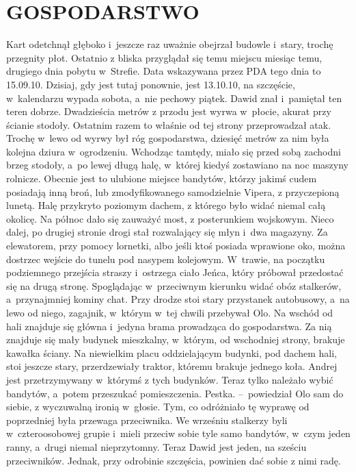 \documentclass[../MAIN.tex]{subfiles}
\begin{document}
\section*{GOSPODARSTWO}
\mm Kart odetchnął głęboko i~jeszcze raz uważnie obejrzał budowle i~stary, trochę przegnity płot. Ostatnio z bliska przyglądał się temu miejscu miesiąc temu, drugiego dnia pobytu w~Strefie. Data wskazywana przez PDA tego dnia to 15.09.10. Dzisiaj, gdy jest tutaj ponownie, jest 13.10.10, na szczęście, w~kalendarzu wypada sobota, a~nie pechowy piątek.
\pp
Dawid znał i~pamiętał ten teren dobrze. Dwadzieścia metrów z przodu jest wyrwa w~płocie, akurat przy ścianie stodoły. Ostatnim razem to właśnie od tej strony przeprowadzał atak. Trochę w~lewo od wyrwy był róg gospodarstwa, dziesięć metrów za nim była kolejna dziura w~ogrodzeniu. Wchodząc tamtędy, miało się przed sobą zachodni brzeg stodoły, a~po lewej długą halę, w~której kiedyś zostawiano na noc maszyny rolnicze. Obecnie jest to ulubione miejsce bandytów, którzy jakimś cudem posiadają inną broń, lub zmodyfikowanego samodzielnie Vipera, z przyczepioną lunetą. Halę przykryto poziomym dachem, z którego było widać niemal całą okolicę. Na północ dało się zauważyć most, z posterunkiem wojskowym. Nieco dalej, po drugiej stronie drogi stał rozwalający się młyn i~dwa magazyny. Za elewatorem, przy pomocy lornetki, albo jeśli ktoś posiada wprawione oko, można dostrzec wejście do tunelu pod nasypem kolejowym. W~trawie, na początku podziemnego przejścia straszy i~ostrzega ciało Jeńca, który próbował przedostać się na
drugą stronę. Spoglądając w~przeciwnym kierunku widać obóz stalkerów, a~przynajmniej kominy chat. Przy drodze stoi stary przystanek autobusowy, a~na lewo od niego, zagajnik, w~którym w~tej chwili przebywał Olo. Na wschód od hali znajduje się główna i~jedyna brama prowadząca do gospodarstwa. Za nią znajduje się mały budynek mieszkalny, w~którym, od wschodniej strony, brakuje kawałka ściany. Na niewielkim placu oddzielającym budynki, pod dachem hali, stoi jeszcze stary, przerdzewiały traktor, któremu brakuje jednego koła.
Andrej jest przetrzymywany w~którymś z tych budynków. Teraz tylko należało wybić bandytów, a~potem przeszukać pomieszczenia.
\dd
\sd
\xx Pestka. --~powiedział Olo sam do siebie, z wyczuwalną ironią w~głosie.
\qd
\dd
\hspace{1ex}Tym, co odróżniało tę wyprawę od poprzedniej była przewaga przeciwnika. We wrześniu stalkerzy byli w~czteroosobowej grupie i~mieli przeciw sobie tyle samo bandytów, w~czym jeden ranny, a~drugi niemal nieprzytomny. Teraz Dawid jest jeden, na sześciu przeciwników. Jednak, przy odrobinie szczęścia, powinien dać sobie z nimi radę.
\end{document}
